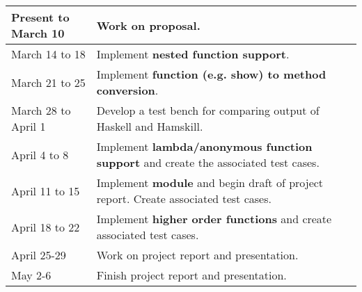 \documentclass{report}
\begin{document}
\begin{table}[h]

\begin{center}
  \begin{tabular}{ | >{\centering\arraybackslash}m{1in} || m{3in} | }
    \hline
    Present to March 10 & Work on proposal. \\ \hline
    March 14 to 18 & Implement \textbf{nested function support}. \\ \hline
    March 21 to 25 & Implement \textbf{function (e.g. show) to method conversion}. \\ \hline
    March 28 to April 1 & Develop a test bench for comparing output of Haskell and Hamskill. \\ \hline
    April 4 to 8 & Implement \textbf{lambda/anonymous function support} and create the associated test cases. \\ \hline
    April 11 to 15 & Implement \textbf{module} and begin draft of project report.  Create associated test cases. \\ \hline
    April 18 to 22 & Implement \textbf{higher order functions} and create associated test cases. \\ \hline
    April 25-29 & Work on project report and presentation.  \\ \hline
    May 2-6 & Finish project report and presentation.  \\ \hline
  \end{tabular}
\end{center}
\end{table}

\pagebreak


\end{document}

